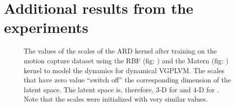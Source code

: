 \section{Additional results from the experiments}
\begin{figure}[ht]
\begin{center}
\end{center}
\caption{\small{
The values of the scales of the ARD kernel after training on the motion capture dataset using the RBF (fig: ) and the Matern (fig: ) kernel to model the dynamics for dynamical VGPLVM. The scales that have zero value ``switch off'' the corresponding dimension of the latent space. The latent space is, therefore, 3-D for  and 4-D for . Note that the scales were initialized with very similar values.
}
}
\label{fig:supplMocap1}
\end{figure}



